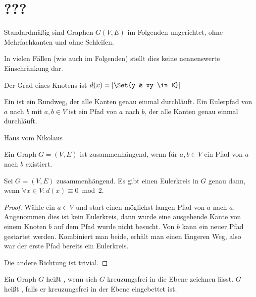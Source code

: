 \chapter{???}


\begin{conv}
    Standardmäßig sind Graphen $G(V, E)$ im Folgenden ungerichtet, ohne Mehrfachkanten und ohne Schleifen.
\end{conv}

In vielen Fällen (wie auch im Folgenden) stellt dies keine nennenswerte Einschränkung dar.

\begin{df}
    Der Grad eines Knotens ist
    \begin{math}
        d(x) = |\Set{y & xy \in E}|
    \end{math}
\end{df}

\begin{df}
    Ein  ist ein Rundweg, der alle Kanten genau einmal durchläuft.
    Ein Eulerpfad von $a$ nach $b$ mit $a,b \in V$ ist ein Pfad von $a$ nach $b$, der alle Kanten genau einmal durchläuft.
\end{df}

\begin{ex}
    Haus vom Nikolaus
\end{ex}

\begin{df}
    Ein Graph $G = (V, E)$ ist zusammenhängend, wenn für $a,b \in V$ ein Pfad von $a$ nach $b$ existiert.
\end{df}


\begin{st}
    Sei $G = (V, E)$ zusammenhängend.
    Es gibt einen Eulerkreis in $G$ genau dann, wenn $\forall x \in V: d(x) \equiv 0 \bmod 2$.
    \begin{proof}
        Wähle ein $a \in V$ und start einen möglichst langen Pfad von $a$ nach $a$.
        Angenommen dies ist kein Eulerkreis, dann wurde eine ausgehende Kante von einem Knoten $b$ auf dem Pfad wurde nicht besucht.
        Von $b$ kann ein neuer Pfad gestartet werden.
        Kombiniert man beide, erhält man einen längeren Weg, also war der erste Pfad bereits ein Eulerkreis.

        Die andere Richtung ist trivial.
    \end{proof}
\end{st}

\begin{df}
    Ein Graph $G$ heißt , wenn sich $G$ kreuzungsfrei in die Ebene zeichnen lässt.
    $G$ heißt , falls er kreuzungsfrei in der Ebene eingebettet ist.
\end{df}

